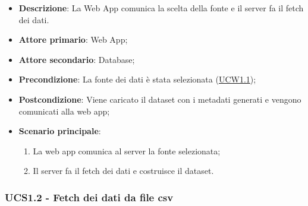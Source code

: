 \begin{itemize}

	\item \textbf{Descrizione}: La Web App comunica la scelta della fonte e il server fa il fetch dei dati.

	\item \textbf{Attore primario}: Web App;
	\item \textbf{Attore secondario}: Database;

	\item \textbf{Precondizione}:   La fonte dei dati è stata selezionata (\hyperref[ssub:ucw1.1]{UCW1.1});

	\item \textbf{Postcondizione}:  Viene caricato il dataset con i metadati generati e vengono comunicati alla web app;

	\item \textbf{Scenario principale}:
	      \begin{enumerate}
		      \item La web app comunica al server la fonte selezionata;
		      \item Il server fa il fetch dei dati e costruisce il dataset.
	      \end{enumerate}

\end{itemize}


\subsubsection{UCS1.2 - Fetch dei dati da file csv}
\label{ssub:ucs1.2}

